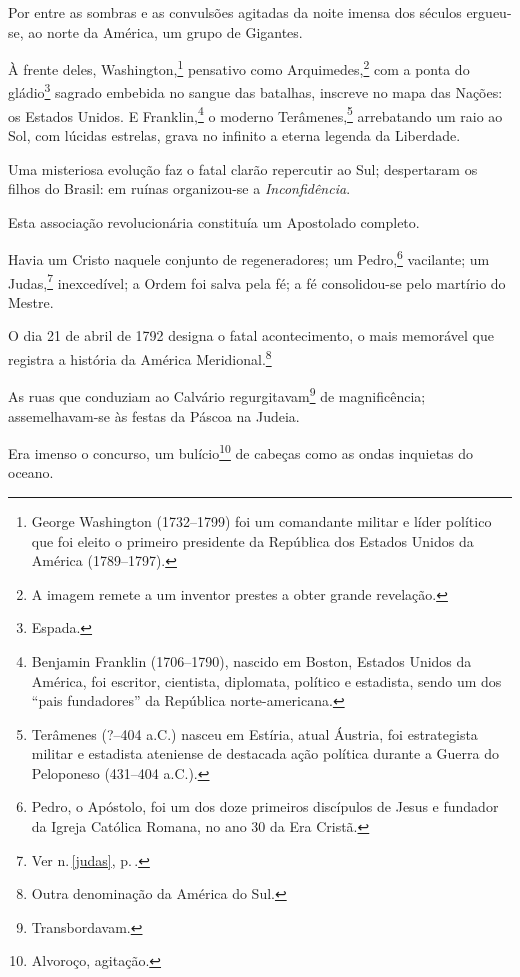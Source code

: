 Por entre as sombras e as convulsões agitadas da noite imensa dos
séculos ergueu-se, ao norte da América, um grupo de Gigantes.

À frente deles, Washington,\footnote{George Washington (1732--1799) foi
  um comandante militar e líder político que foi eleito o primeiro
  presidente da República dos Estados Unidos da América (1789--1797).}
pensativo como Arquimedes,\footnote{A
  imagem remete a um inventor prestes a obter grande revelação.}
com a ponta do gládio\footnote{Espada.} sagrado embebida no sangue das
batalhas, inscreve no mapa das Nações: os Estados Unidos. E
Franklin,\footnote{Benjamin Franklin (1706--1790), nascido em Boston,
  Estados Unidos da América, foi escritor, cientista, diplomata,
  político e estadista, sendo um dos ``pais fundadores'' da República
  norte-americana.} o moderno Terâmenes,\footnote{Terâmenes (?--404
  a.C.) nasceu em Estíria, atual Áustria, foi estrategista militar e
  estadista ateniense de destacada ação política durante a Guerra do
  Peloponeso (431--404 a.C.).} arrebatando um raio ao Sol, com
lúcidas estrelas, grava no infinito a eterna legenda da Liberdade.

Uma misteriosa evolução faz o fatal clarão repercutir ao Sul;
despertaram os filhos do Brasil: em ruínas organizou-se a
\emph{Inconfidência}.

Esta associação revolucionária constituía um Apostolado completo.

Havia um Cristo naquele conjunto de regeneradores; um Pedro,\footnote{
  Pedro, o Apóstolo, foi um dos doze primeiros discípulos de Jesus e
  fundador da Igreja Católica Romana, no ano 30 da Era Cristã.}
vacilante; um Judas,\footnote{Ver n.\,\ref{judas}, p.\,\pageref{judas}.}
inexcedível; a Ordem foi salva pela fé; a fé consolidou-se pelo martírio
do Mestre.

O dia 21 de abril de 1792 designa o fatal acontecimento, o mais
memorável que registra a história da América Meridional.\footnote{
  Outra denominação da América do Sul.}

As ruas que conduziam ao Calvário regurgitavam\footnote{
  Transbordavam.} de magnificência; assemelhavam-se às festas da Páscoa
na Judeia.

Era imenso o concurso, um bulício\footnote{Alvoroço, agitação.} de
cabeças como as ondas inquietas do oceano.

